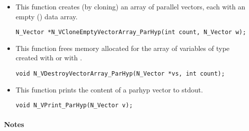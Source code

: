 \begin{itemize}

\item {}
 
  This function creates (by cloning) an array of  parallel vectors,
  each with an empty () data array.
 
\begin{verbatim}
N_Vector *N_VCloneEmptyVectorArray_ParHyp(int count, N_Vector w);
\end{verbatim}


\item {}
 
 This function frees memory allocated for the array of   variables of
 type  created with  or with
 .
 

 \verb|void N_VDestroyVectorArray_ParHyp(N_Vector *vs, int count);|



\item {}
  
  This function prints the content of a parhyp vector to stdout.
 
    
  \verb|void N_VPrint_ParHyp(N_Vector v);|


\end{itemize}
\paragraph{\bf Notes} 
           
